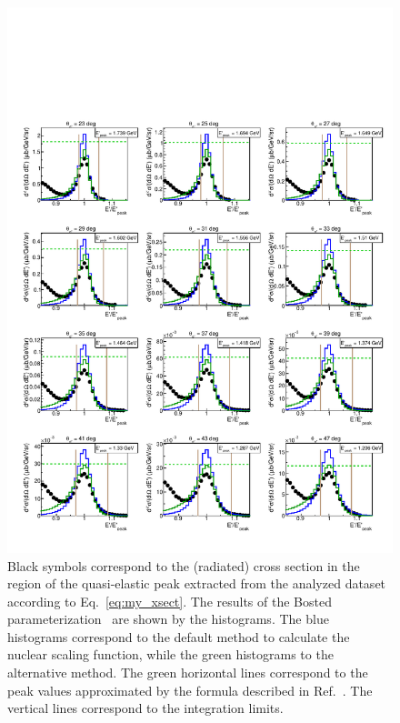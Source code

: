 \begin{figure}[htp]
\begin{center}
\includegraphics[width=\textwidth]{pictures/normalization/my_xsect_pdf.pdf}
\caption{\small Black symbols correspond to the (radiated) cross section in the region of the quasi-elastic peak extracted from the analyzed dataset according to Eq.~\eqref{eq:my_xsect}. The results of the Bosted parameterization~\cite{Bosted_fit,Bosted:2007xd} are shown by the histograms. The blue histograms correspond to the default method to calculate the nuclear scaling function, while the green histograms to the alternative method. The green horizontal lines correspond to the peak values approximated by the formula described in Ref.~\cite{note_QE_peak}. The vertical lines correspond to the integration limits. } \label{fig:my_QE}
\end{center}
\end{figure}
